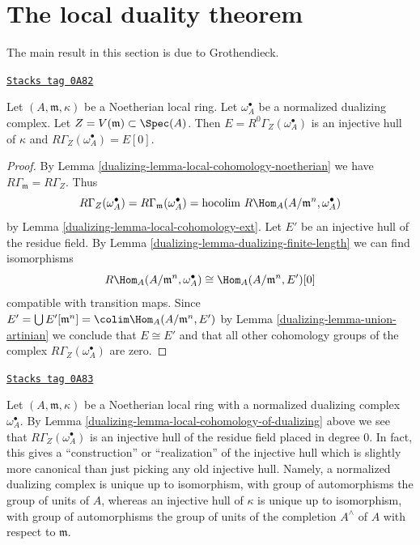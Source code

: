 \section{The local duality theorem}
\label{dualizing-section-local-duality}
The main result in this section is due to Grothendieck.

\begin{lemma}
\label{dualizing-lemma-local-cohomology-of-dualizing}
\href{https://stacks.math.columbia.edu/tag/0A82}{\texttt{Stacks tag 0A82}}

Let $(A, \mathfrak m, \kappa)$ be a Noetherian local ring.
Let $\omega_A^\bullet$ be a normalized dualizing complex.
Let $Z = V(\mathfrak m) \subset \Spec(A)$.
Then $E = R^0\Gamma_Z(\omega_A^\bullet)$ is an injective hull of
$\kappa$ and $R\Gamma_Z(\omega_A^\bullet) = E[0]$.
\end{lemma}

\begin{proof}

By Lemma \ref{dualizing-lemma-local-cohomology-noetherian} we have
$R\Gamma_{\mathfrak m} = R\Gamma_Z$. Thus
$$
R\Gamma_Z(\omega_A^\bullet) =
R\Gamma_{\mathfrak m}(\omega_A^\bullet) =
\text{hocolim}\ R\Hom_A(A/\mathfrak m^n, \omega_A^\bullet)
$$
by Lemma \ref{dualizing-lemma-local-cohomology-ext}. Let $E'$ be an injective
hull of the residue field.
By Lemma \ref{dualizing-lemma-dualizing-finite-length}
we can find isomorphisms
$$
R\Hom_A(A/\mathfrak m^n, \omega_A^\bullet) \cong \Hom_A(A/\mathfrak m^n, E')[0]
$$
compatible with transition maps. Since
$E' = \bigcup E'[\mathfrak m^n] = \colim \Hom_A(A/\mathfrak m^n, E')$
by Lemma \ref{dualizing-lemma-union-artinian}
we conclude that $E \cong E'$ and that all other cohomology
groups of the complex $R\Gamma_Z(\omega_A^\bullet)$ are zero.
\end{proof}

\begin{remark}
\label{dualizing-remark-specific-injective-hull}
\href{https://stacks.math.columbia.edu/tag/0A83}{\texttt{Stacks tag 0A83}}

Let $(A, \mathfrak m, \kappa)$ be a Noetherian local ring
with a normalized dualizing complex $\omega_A^\bullet$.
By Lemma \ref{dualizing-lemma-local-cohomology-of-dualizing}
above we see that $R\Gamma_Z(\omega_A^\bullet)$
is an injective hull of the residue field placed in degree $0$.
In fact, this gives a ``construction'' or ``realization''
of the injective hull which is slightly more canonical than
just picking any old injective hull. Namely, a normalized
dualizing complex is unique up to isomorphism, with group
of automorphisms the group of units of $A$, whereas an
injective hull of $\kappa$ is unique up to isomorphism, with
group of automorphisms the group of units of the completion
$A^\wedge$ of $A$ with respect to $\mathfrak m$.
\end{remark}

